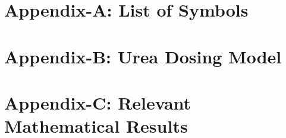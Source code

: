 \section{Appendix-A: List of Symbols}


\section{Appendix-B: Urea Dosing Model}


\section{Appendix-C: Relevant Mathematical Results}


